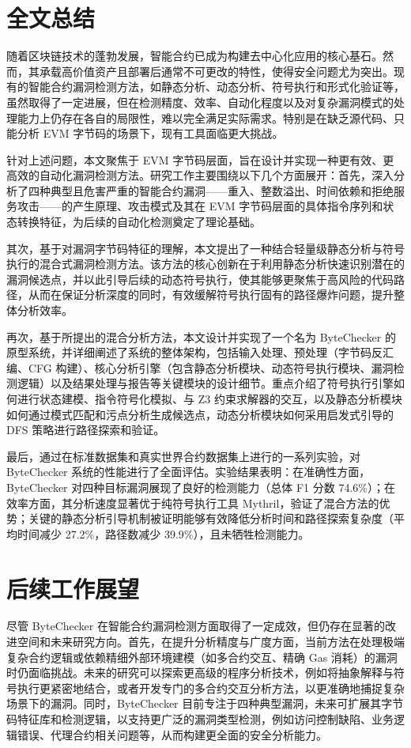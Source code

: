 \documentclass[print, master, vlined, timesmath]{DissertUESTC}
\begin{document}
\section{全文总结}

随着区块链技术的蓬勃发展，智能合约已成为构建去中心化应用的核心基石。然而，其承载高价值资产且部署后通常不可更改的特性，使得安全问题尤为突出。现有的智能合约漏洞检测方法，如静态分析、动态分析、符号执行和形式化验证等，虽然取得了一定进展，但在检测精度、效率、自动化程度以及对复杂漏洞模式的处理能力上仍存在各自的局限性，难以完全满足实际需求。特别是在缺乏源代码、只能分析 EVM 字节码的场景下，现有工具面临更大挑战。

针对上述问题，本文聚焦于 EVM 字节码层面，旨在设计并实现一种更有效、更高效的自动化漏洞检测方法。研究工作主要围绕以下几个方面展开：首先，深入分析了四种典型且危害严重的智能合约漏洞——重入、整数溢出、时间依赖和拒绝服务攻击——的产生原理、攻击模式及其在 EVM 字节码层面的具体指令序列和状态转换特征，为后续的自动化检测奠定了理论基础。

其次，基于对漏洞字节码特征的理解，本文提出了一种结合轻量级静态分析与符号执行的混合式漏洞检测方法。该方法的核心创新在于利用静态分析快速识别潜在的漏洞候选点，并以此引导后续的动态符号执行，使其能够更聚焦于高风险的代码路径，从而在保证分析深度的同时，有效缓解符号执行固有的路径爆炸问题，提升整体分析效率。

再次，基于所提出的混合分析方法，本文设计并实现了一个名为 ByteChecker 的原型系统，并详细阐述了系统的整体架构，包括输入处理、预处理（字节码反汇编、CFG 构建）、核心分析引擎（包含静态分析模块、动态符号执行模块、漏洞检测逻辑）以及结果处理与报告等关键模块的设计细节。重点介绍了符号执行引擎如何进行状态建模、指令符号化模拟、与 Z3 约束求解器的交互，以及静态分析模块如何通过模式匹配和污点分析生成候选点，动态分析模块如何采用启发式引导的 DFS 策略进行路径探索和验证。

最后，通过在标准数据集和真实世界合约数据集上进行的一系列实验，对 ByteChecker 系统的性能进行了全面评估。实验结果表明：在准确性方面，ByteChecker 对四种目标漏洞展现了良好的检测能力（总体 F1 分数 74.6\%）；在效率方面，其分析速度显著优于纯符号执行工具 Mythril，验证了混合方法的优势；关键的静态分析引导机制被证明能够有效降低分析时间和路径探索复杂度（平均时间减少 27.2\%，路径数减少 39.9\%），且未牺牲检测能力。

\section{后续工作展望}

尽管 ByteChecker 在智能合约漏洞检测方面取得了一定成效，但仍存在显著的改进空间和未来研究方向。首先，在提升分析精度与广度方面，当前方法在处理极端复杂合约逻辑或依赖精细外部环境建模（如多合约交互、精确 Gas 消耗）的漏洞时仍面临挑战。未来的研究可以探索更高级的程序分析技术，例如将抽象解释与符号执行更紧密地结合，或者开发专门的多合约交互分析方法，以更准确地捕捉复杂场景下的漏洞。同时，ByteChecker 目前专注于四种典型漏洞，未来可扩展其字节码特征库和检测逻辑，以支持更广泛的漏洞类型检测，例如访问控制缺陷、业务逻辑错误、代理合约相关问题等，从而构建更全面的安全分析能力。
\end{document}
